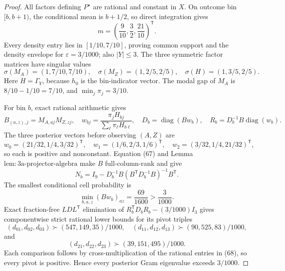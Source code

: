 \documentclass{article}
\begin{document}
\begin{proof}
All factors defining \(P^\star\) are rational and constant in \(X\).  On outcome bin \([b,b+1)\), the conditional mean is \(b+1/2\), so direct integration gives
\[
 m=\left(\frac9{10},\frac32,\frac{21}{10}\right)^{\mathsf T}. \tag{66}
\]
Every density entry lies in \([1/10,7/10]\), proving common support and the density envelope for \(\varepsilon=3/1000\); also \(|Y|\leq3\).  The three symmetric factor matrices have singular values
\[
 \sigma(M_A)=(1,7/10,7/10),\quad
 \sigma(M_Z)=(1,2/5,2/5),\quad
 \sigma(H)=(1,3/5,2/5). \tag{67}
\]
Here \(H=\Gamma_Y\), because \(h_0\) is the bin-indicator vector.  The modal gap of \(M_A\) is \(8/10-1/10=7/10\), and \(\min_j\pi_j=3/10\).

For bin \(b\), exact rational arithmetic gives
\[
 B_{(a,z),j}=M_{A,aj}M_{Z,zj},\quad
 w_{bj}=\frac{\pi_jH_{bj}}{\sum_\ell\pi_\ell H_{b\ell}},\quad
 D_b=\operatorname{diag}(Bw_b),\quad
 R_b=D_b^{-1}B\operatorname{diag}(w_b). \tag{68}
\]
The three posterior vectors before observing \((A,Z)\) are
\[
 w_0=(21/32,1/4,3/32)^{\mathsf T},\quad
 w_1=(1/6,2/3,1/6)^{\mathsf T},\quad
 w_2=(3/32,1/4,21/32)^{\mathsf T}, \tag{69}
\]
so each is positive and nonconstant.  Equation (67) and Lemma \(\mathrm{lem{:}3a\mbox{-}projector\mbox{-}algebra}\) make \(B\) full-column-rank and give
\[
 N_b=I_9-D_b^{-1}B(B^{\mathsf T}D_b^{-1}B)^{-1}B^{\mathsf T}. \tag{70}
\]
The smallest conditional cell probability is
\[
 \min_{b,a,z}(Bw_b)_{az}=\frac{69}{1600}>\frac3{1000}. \tag{71}
\]
Exact fraction-free \(LDL^{\mathsf T}\) elimination of
\(R_b^{\mathsf T}D_bR_b-(3/1000)I_3\) gives componentwise strict rational lower bounds for its pivot triples
\[
 (d_{01},d_{02},d_{03})\succ(547,149,35)/1000,\quad
 (d_{11},d_{12},d_{13})\succ(90,525,83)/1000, \tag{72}
\]
and
\[
 (d_{21},d_{22},d_{23})\succ(39,151,495)/1000. \tag{73}
\]
Each comparison follows by cross-multiplication of the rational entries in (68), so every pivot is positive.  Hence every posterior Gram eigenvalue exceeds \(3/1000\).


\end{proof}
\end{document}
